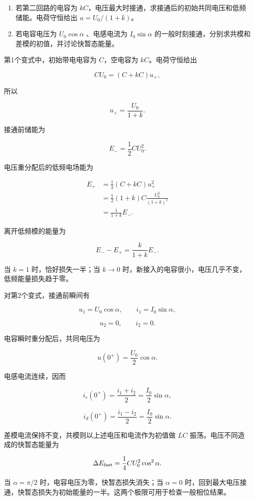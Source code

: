 \documentclass[12pt,a4paper,UTF8]{ctexart}
\newcommand{\tightlist}{\setlength{\itemsep}{0pt}\setlength{\parskip}{0pt}}
\begin{document}
\begin{enumerate}
\def\labelenumi{\arabic{enumi}.}
\tightlist
\item
  若第二回路的电容为
  \(kC\)，电压最大时接通，求接通后的初始共同电压和低频储能。电荷守恒给出
  \(u=U_0/(1+k)\)。
\item
  若电容电压为 \(U_0\cos\alpha\) 、电感电流为 \(I_0\sin\alpha\)
  的一般时刻接通，分别求共模和差模的初值，并讨论快暂态能量。
\end{enumerate}

第1个变式中，初始带电电容为 \(C\)，空电容为 \(kC\)。电荷守恒给出

\[CU_0=(C+kC)u_+,\]

所以

\[\boxed{u_+=\frac{U_0}{1+k}}.\]

接通前储能为

\[E_- =\frac12CU_0^2.\]

电压重分配后的低频电场能为

\[\begin{aligned}
E_+
&=\frac12(C+kC)u_+^2\\
&=\frac12(1+k)C\frac{U_0^2}{(1+k)^2}\\
&=\frac{1}{1+k}E_-.
\end{aligned}\]

离开低频模的能量为

\[\boxed{E_--E_+=\frac{k}{1+k}E_-}.\]

当 \(k=1\) 时，恰好损失一半；当 \(k\to0\)
时，新接入的电容很小，电压几乎不变，低频能量损失趋于零。

对第2个变式，接通前瞬间有

\[u_1=U_0\cos\alpha,\qquad
i_1=I_0\sin\alpha,\]

\[u_2=0,\qquad i_2=0.\]

电容瞬时重分配后，共同电压为

\[u(0^+)=\frac{U_0}{2}\cos\alpha.\]

电感电流连续，因而

\[i_c(0^+)=\frac{i_1+i_2}{2}
=\frac{I_0}{2}\sin\alpha,\]

\[i_d(0^+)=\frac{i_1-i_2}{2}
=\frac{I_0}{2}\sin\alpha.\]

差模电流保持不变，共模则以上述电压和电流作为初值做 \(LC\)
振荡。电压不同造成的快暂态能量为

\[\Delta E_{\rm fast}
=\frac14CU_0^2\cos^2\alpha.\]

当 \(\alpha=\pi/2\) 时，电容电压为零，快暂态损失消失；当 \(\alpha=0\)
时，回到最大电压接通，快暂态损失为初始能量的一半。这两个极限可用于检查一般相位结果。
\end{document}
